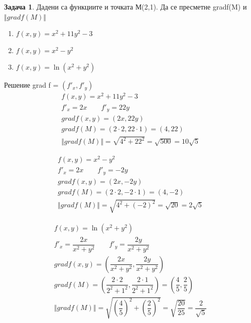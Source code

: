 \documentclass[a4paper,fleqn,12pt]{article}
\theoremstyle{definition}
\newtheorem{task}{Задача}[subsection]
\begin{document}
\begin{task}
Дадени са функциите и точката М(2,1). Да се пресметне gradf(M) и $\Vert grad f(M)\Vert$
\begin{enumerate}
\item $ f(x,y) = x^2 + 11y^2 - 3$
\item $ f(x,y) = x^2 - y^2$
\item $ f(x,y) = \ln{(x^2 + y^2)}$
\end{enumerate}
Решение grad f = $(f'_x, f'_y)$
\begin{gather*}
 f(x,y) = x^2 + 11y^2 - 3\\
f'_x = 2x \qquad f'_y = 22y\\ 
gradf(x,y) = (2x, 22y)\\ 
gradf(M) = (2\cdot 2, 22 \cdot 1) = (4,22)\\
\Vert grad f(M)\Vert = \sqrt{4^2 + 22^2} = \sqrt{500} =  10\sqrt{5}
\end{gather*}

\begin{gather*}
f(x,y) = x^2 - y^2\\
f'_x = 2x \qquad f'_y = -2y\\ 
gradf(x,y) = (2x, -2y)\\ 
gradf(M) = (2\cdot 2, -2 \cdot 1) = (4,-2)\\
\Vert grad f(M)\Vert = \sqrt{4^2 + (-2)^2} = \sqrt{20} =  2\sqrt{5}
\end{gather*}

\begin{gather*}
f(x,y) = \ln{(x^2 + y^2)}\\
f'_x = \dfrac{2x}{x^2+y^2} \qquad f'_y = \dfrac{2y}{x^2+y^2}\\ 
gradf(x,y) = \left(\dfrac{2x}{x^2+y^2} , \dfrac{2y}{x^2+y^2} \right)\\ 
gradf(M) = \left(\dfrac{2 \cdot 2}{2^2+1^2}, \dfrac{2 \cdot 1}{2^2+1^2} \right) = \left(\dfrac{4}{5} , \dfrac{2}{5} \right) \\
\Vert grad f(M)\Vert = \sqrt{\left( \dfrac{4}{5} \right) ^2 + \left( \dfrac{2}{5} \right) ^2} = \sqrt{\dfrac{20}{25}} = \dfrac{2}{\sqrt{5}}
\end{gather*}

\end{task}
\end{document}
